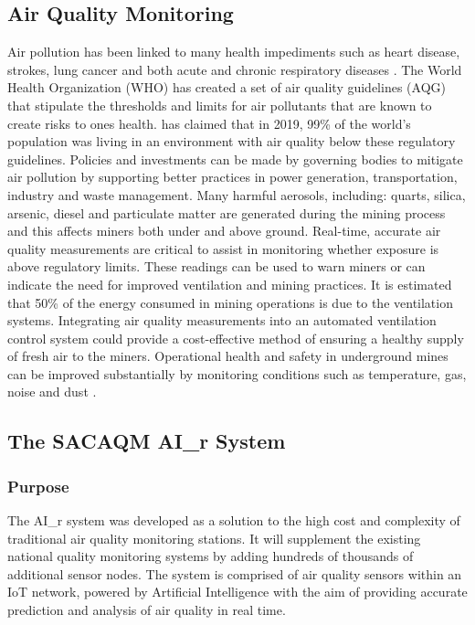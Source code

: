 \documentclass[a4paper,twoside,12pt]{report}
\begin{document}
\subsection{Air Quality Monitoring}
 Air pollution has been linked to many health impediments such as heart disease, strokes, lung cancer and both acute and chronic respiratory diseases \citep{WHO_2022}. The World Health Organization (WHO) has created a set of air quality guidelines (AQG) that stipulate the thresholds and limits for air pollutants that are known to create risks to ones health. \cite{WHO_2022} has claimed that in 2019, 99\% of the world's population was living in an environment with air quality below these regulatory guidelines. Policies and investments can be made by governing bodies to mitigate air pollution by supporting better practices in power generation, transportation, industry and waste management.
 \newline \newline
Many harmful aerosols, including: quarts, silica, arsenic, diesel and particulate matter are generated during the mining process and this affects miners both under and above ground\citep{Hercus_2022}. Real-time, accurate air quality measurements are critical to assist in monitoring whether exposure is above regulatory limits. These readings can be used to warn miners or can indicate the need for improved ventilation and mining practices. It is estimated that 50\% of the energy consumed in mining operations is due to the ventilation systems\citep{Hercus_2022}. Integrating air quality measurements into an automated ventilation control system could provide a cost-effective method of ensuring a healthy supply of fresh air to the miners. Operational health and safety in underground mines can be improved substantially by monitoring conditions such as temperature, gas, noise and dust \citep{Sadeghi2022ApplicationsMines}.

\subsection{The SACAQM AI\_r System}
\subsubsection{Purpose}
The AI\_r system was developed as a solution to the high cost and complexity of traditional air quality monitoring stations\citep{SACAQM}. It will supplement the existing national quality monitoring systems by adding hundreds of thousands of additional sensor nodes. The system is comprised of air quality sensors within an IoT network, powered by Artificial Intelligence with the aim of providing accurate prediction and analysis of air quality in real time\citep{SACAQM}.
\end{document}
